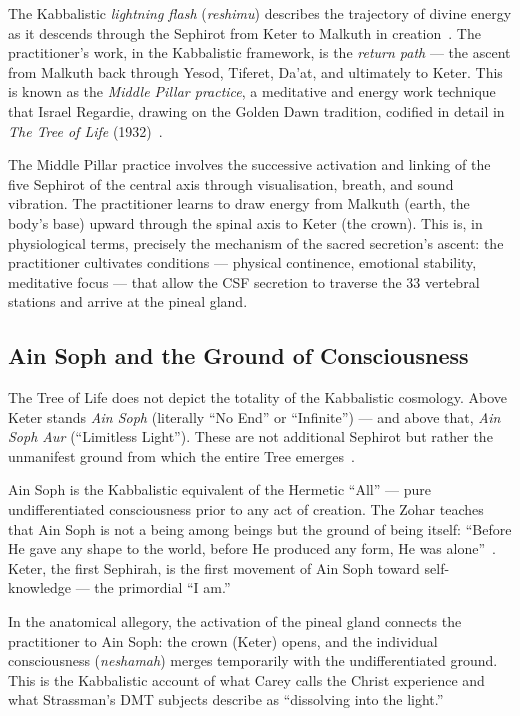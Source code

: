 \documentclass[12pt, a4paper]{article}
\begin{document}
The Kabbalistic \emph{lightning flash} (\emph{reshimu}) describes the
trajectory of divine energy as it descends through the Sephirot from Keter to
Malkuth in creation~\autocite[120]{scholem1941}. The practitioner's work, in
the Kabbalistic framework, is the \emph{return path} — the ascent from
Malkuth back through Yesod, Tiferet, Da'at, and ultimately to Keter. This
is known as the \emph{Middle Pillar practice}, a meditative and energy work
technique that Israel Regardie, drawing on the Golden Dawn tradition,
codified in detail in \emph{The Tree of Life} (1932)~\autocite{regardie1932}.

The Middle Pillar practice involves the successive activation and linking of
the five Sephirot of the central axis through visualisation, breath, and
sound vibration. The practitioner learns to draw energy from Malkuth
(earth, the body's base) upward through the spinal axis to Keter (the
crown). This is, in physiological terms, precisely the mechanism of the
sacred secretion's ascent: the practitioner cultivates conditions — physical
continence, emotional stability, meditative focus — that allow the CSF
secretion to traverse the 33 vertebral stations and arrive at the pineal gland.

\subsection{Ain Soph and the Ground of Consciousness}

The Tree of Life does not depict the totality of the Kabbalistic cosmology.
Above Keter stands \emph{Ain Soph} (literally ``No End'' or ``Infinite'') —
and above that, \emph{Ain Soph Aur} (``Limitless Light''). These are not
additional Sephirot but rather the unmanifest ground from which the entire
Tree emerges~\autocite[88]{scholem1974}.

Ain Soph is the Kabbalistic equivalent of the Hermetic ``All'' — pure
undifferentiated consciousness prior to any act of creation. The Zohar
teaches that Ain Soph is not a being among beings but the ground of being
itself: ``Before He gave any shape to the world, before He produced any form,
He was alone''~\autocite[89]{zohar2003}. Keter, the first Sephirah, is the
first movement of Ain Soph toward self-knowledge — the primordial ``I am.''

In the anatomical allegory, the activation of the pineal gland connects the
practitioner to Ain Soph: the crown (Keter) opens, and the individual
consciousness (\emph{neshamah}) merges temporarily with the undifferentiated
ground. This is the Kabbalistic account of what Carey calls the Christ
experience and what Strassman's DMT subjects describe as ``dissolving into the
light.''
\end{document}
